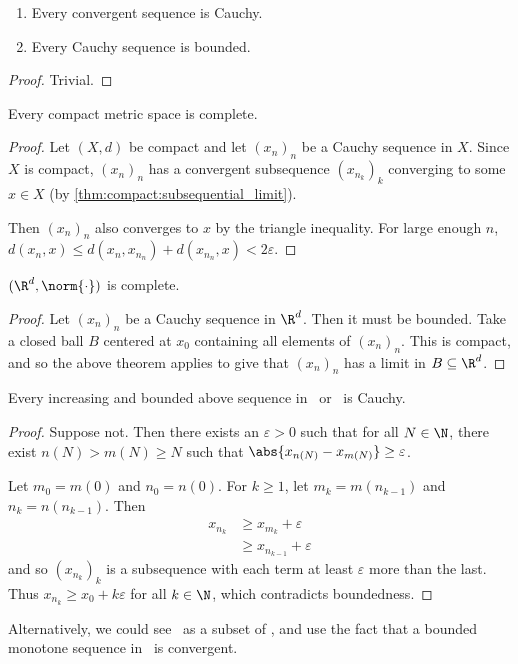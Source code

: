 \begin{theorem} \leavevmode
    \begin{enumerate}[label=(\alph*)]
        \item Every convergent sequence is Cauchy.
        \item Every Cauchy sequence is bounded.
    \end{enumerate}
\end{theorem}
\begin{proof}
    Trivial.
\end{proof}

\begin{theorem*}
    Every compact metric space is complete.
\end{theorem*}
\begin{proof}
    Let $(X, d)$ be compact and let $(x_n)_n$ be a Cauchy sequence in $X$.
    Since $X$ is compact, $(x_n)_n$ has a convergent subsequence
    $(x_{n_k})_k$ converging to some $x \in X$
    (by \cref{thm:compact:subsequential_limit}).

    Then $(x_n)_n$ also converges to $x$ by the triangle inequality.
    For large enough $n$, $d(x_n, x) \le d(x_n, x_{n_n}) + d(x_{n_n}, x)
    < 2\varepsilon$.
\end{proof}
\begin{theorem}
    $(\R^d, \norm{\cdot})$ is complete.
\end{theorem}
\begin{proof}
    Let $(x_n)_n$ be a Cauchy sequence in $\R^d$.
    Then it must be bounded.
    Take a closed ball $B$ centered at $x_0$ containing all elements of
    $(x_n)_n$.
    This is compact, and so the above theorem applies to give that
    $(x_n)_n$ has a limit in $B \subseteq \R^d$.
\end{proof}

\begin{exercise}
    Every increasing and bounded above sequence in \Q\ or \R\ is Cauchy.
\end{exercise}
\begin{proof}
    Suppose not.
    Then there exists an $\varepsilon > 0$ such that for all $N \in \N$,
    there exist $n(N) > m(N) \ge N$ such that
    $\abs{x_{n(N)} - x_{m(N)}} \ge \varepsilon$.

    Let $m_0 = m(0)$ and $n_0 = n(0)$.
    For $k \ge 1$, let $m_k = m(n_{k-1})$ and $n_k = n(n_{k-1})$.
    Then \begin{align*}
        x_{n_k} &\ge x_{m_k} + \varepsilon \\
               &\ge x_{n_{k-1}} + \varepsilon
    \end{align*} and so $(x_{n_k})_k$ is a subsequence with each term at
    least $\varepsilon$ more than the last.
    Thus $x_{n_k} \ge x_0 + k\varepsilon$ for all $k \in \N$, which
    contradicts boundedness.
\end{proof}
Alternatively, we could see \Q\ as a subset of \R, and use the fact that
a bounded monotone sequence in \R\ is convergent.
